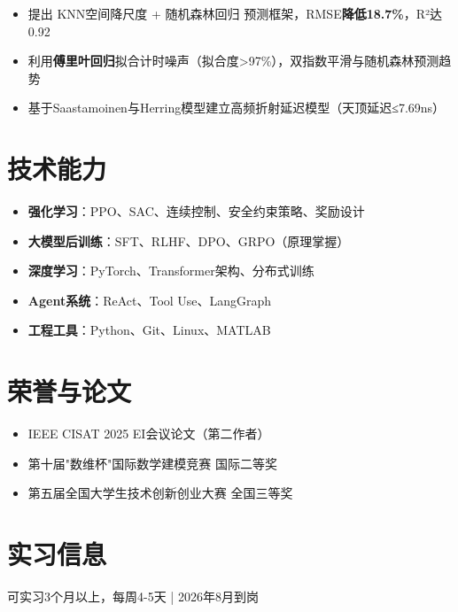 \documentclass{resume}
\begin{document}
\begin{itemize}
  \item 提出 KNN空间降尺度 + 随机森林回归 预测框架，RMSE\textbf{降低18.7\%}，R²达0.92
\end{itemize}

\begin{itemize}
  \item 利用\textbf{傅里叶回归}拟合计时噪声（拟合度>97\%），双指数平滑与随机森林预测趋势
  \item 基于Saastamoinen与Herring模型建立高频折射延迟模型（天顶延迟≤7.69ns）
\end{itemize}

\section{技术能力}
\begin{itemize}
  \item \textbf{强化学习}：PPO、SAC、连续控制、安全约束策略、奖励设计
  \item \textbf{大模型后训练}：SFT、RLHF、DPO、GRPO（原理掌握）
  \item \textbf{深度学习}：PyTorch、Transformer架构、分布式训练
  \item \textbf{Agent系统}：ReAct、Tool Use、LangGraph
  \item \textbf{工程工具}：Python、Git、Linux、MATLAB
\end{itemize}

\section{荣誉与论文}
\begin{itemize}
  \item IEEE CISAT 2025 EI会议论文（第二作者）
  \item 第十届"数维杯"国际数学建模竞赛 国际二等奖
  \item 第五届全国大学生技术创新创业大赛 全国三等奖
\end{itemize}

\section{实习信息}
可实习3个月以上，每周4-5天 | 2026年8月到岗
\end{document}
